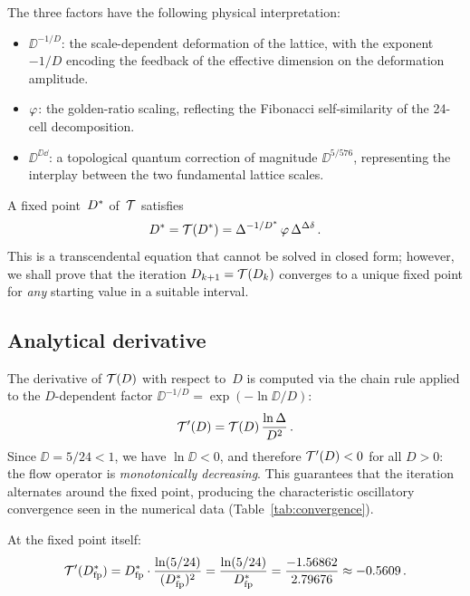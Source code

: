 \documentclass[amsmath,amssymb,aps,prd,twocolumn,superscriptaddress,nofootinbib]{revtex4-2}
\begin{document}
The three factors have the following physical interpretation:
\begin{itemize}
  \item $\DD^{-1/D}$: the scale-dependent deformation of the
    lattice, with the exponent $-1/D$ encoding the feedback of
    the effective dimension on the deformation amplitude.
  \item $\varphi$: the golden-ratio scaling, reflecting the Fibonacci
    self-similarity of the 24-cell decomposition.
  \item $\DD^{\DD\dd}$: a topological quantum correction of
    magnitude $\DD^{5/576}$, representing the interplay between
    the two fundamental lattice scales.
\end{itemize}

A fixed point~$D^{*}$ of~$\mathcal{T}$ satisfies
\begin{equation}
  D^{*} = \mathcal{T}(D^{*})
         = \Delta^{-1/D^{*}}\,\varphi\,\Delta^{\Delta\delta}\,.
  \label{eq:fp_equation}
\end{equation}
This is a transcendental equation that cannot be solved in closed
form; however, we shall prove that the iteration
$D_{k+1} = \mathcal{T}(D_k)$ converges to a unique fixed point for
\emph{any} starting value in a suitable interval.

\subsection{Analytical derivative}
\label{sec:fp:derivative}

The derivative of $\mathcal{T}(D)$ with respect to~$D$ is computed via
the chain rule applied to the $D$-dependent factor
$\DD^{-1/D} = \exp(-\ln\DD / D)$:
\begin{equation}
  \mathcal{T}'(D) = \mathcal{T}(D)\,\frac{\ln\Delta}{D^2}\,.
  \label{eq:T_derivative}
\end{equation}
Since $\DD = 5/24 < 1$, we have $\ln\DD < 0$, and therefore
$\mathcal{T}'(D) < 0$ for all $D > 0$:  the flow operator is
\emph{monotonically decreasing}.  This guarantees that the
iteration alternates around the fixed point, producing the
characteristic oscillatory convergence seen in the numerical
data (Table~\ref{tab:convergence}).

At the fixed point itself:
\begin{equation}
  \mathcal{T}'(D^{*}_{\mathrm{fp}})
    = D^{*}_{\mathrm{fp}} \cdot \frac{\ln(5/24)}{(D^{*}_{\mathrm{fp}})^2}
    = \frac{\ln(5/24)}{D^{*}_{\mathrm{fp}}}
    = \frac{-1.56862}{2.79676}
    \approx -0.5609\,.
  \label{eq:Tp_at_fp}
\end{equation}
\end{document}
